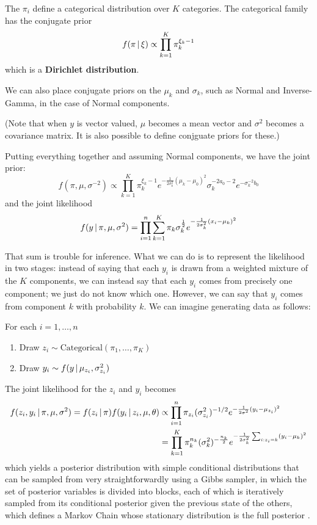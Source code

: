 The $\pi_i$ define a categorical distribution over $K$ categories.
The categorical family has the conjugate prior
\begin{equation}
  f(\pi \, \vert \, \xi) \propto \prod_{k=1}^K \pi_k^{\xi_k - 1}
\end{equation}
which is a {\bf Dirichlet distribution}.

We can also place conjugate priors on the $\mu_k$ and $\sigma_k$, such
as Normal and Inverse-Gamma, in the case of Normal components.

(Note that when $y$ is vector valued, $\mu$ becomes a mean vector and
$\sigma^2$ becomes a covariance matrix.  It is also possible to define
conjguate priors for these.)

Putting everything together and assuming Normal components, we have the joint prior:
\begin{equation}
  f(\pi, \mu, \sigma^{-2}) \propto \prod_{k=1}^K \pi_k^{\xi_k - 1}
  e^{-\frac{1}{2\sigma_k^2} (\mu_k
  - \mu_0)^2} \sigma_k^{-2a_0 - 2} e^{-\sigma_k^{-2} b_0}
\end{equation}
and the joint likelihood
\begin{equation}
  f(y \, \vert \, \pi, \mu, \sigma^2) = \prod_{i=1}^n \sum_{k=1}^K \pi_k
  \sigma_k^{\frac{1}{2}} e^{-\frac{1}{2\sigma_k^2}(x_i - \mu_k)^2}
\end{equation}

That sum is trouble for inference.  
What we can do is to represent the likelihood in two stages: instead
of saying that each $y_i$ is drawn from a weighted mixture of the $K$
components, we can instead say that each $y_i$ comes from precisely
one component; we just do not know which one.  However, we can say
that $y_i$ comes from component $k$ with probability $k$.  We can
imagine generating data as follows:

For each $i = 1, \dots, n$
\begin{enumerate}
\item Draw $z_i \sim \mathrm{Categorical}(\pi_1, \dots, \pi_K)$
\item Draw $y_i \sim f(y \, \vert \, \mu_{z_i}, \sigma^2_{z_i})$
\end{enumerate}

The joint likelihood for the $z_i$ and $y_i$ becomes
\begin{align}
  f(z_i, y_i \, \vert \, \pi, \mu, \sigma^2) = f(z_i \, \vert \, \pi) f(y_i
  \, \vert \, z_i, \mu, \theta) &\propto \prod_{i=1}^n \pi_{z_i}
  (\sigma^2_{z_i})^{-1/2} e^{-\frac{1}{2\sigma^2} (y_i - \mu_{z_i})^2}\\
  &= \prod_{k=1}^K \pi_k^{n_k} (\sigma_k^2)^{-\frac{n_k}{2}}
  e^{-\frac{1}{2\sigma^2_k} \sum_{i: z_i = k} (y_i - \mu_k)^2}
\end{align}
which yields a posterior distribution with simple conditional
distributions that can be sampled from very straightforwardly using a
Gibbs sampler, in which the set of posterior variables is divided into
blocks, each of which is iteratively sampled from its conditional
posterior given the previous state of the others, which defines a
Markov Chain whose stationary distribution is the full posterior 
\citep{geman1984stochastic}.

